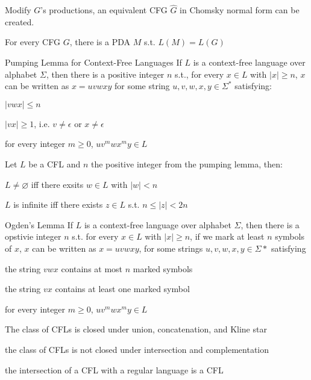 \documentclass[a4paper]{article}
\begin{document}
\begin{Theorem}{}{}
	Modify $G$'s productions, an equivalent CFG  $\hat{G}$ in Chomsky normal form can be created.
\end{Theorem}

\begin{Theorem}{}{}
	For every CFG $G$, there is a PDA  $M$ s.t.  $L(M) = L(G)$
	
\end{Theorem}

\begin{Theorem}{Pumping Lemma for Context-Free Languages}{}
	If $L$ is a context-free language over alphabet  $\Sigma$, then there is a positive integer  $n$ s.t., for every  $x \in L$ with $|x| \ge n$, $x$ can be written as  $x = uvwxy$ for some string  $u,v,w,x,y \in \Sigma^*$ satisfying:

	$|vwx| \le n$

	$|vx| \ge  1$, i.e. $v \neq  \epsilon$ or $x \neq  \epsilon$

	for every integer $m \ge  0$, $uv^m wx^m y \in L$
\end{Theorem}

\begin{Corollary}{}{}
	Let $L$ be a CFL and  $n$ the positive integer from the pumping lemma, then:

	$L \neq \varnothing$ iff there exsits $w \in L$ with $|w| < n$

	 $L$ is infinite iff there exists  $z \in L$ s.t. $n \le |z| < 2n$

\end{Corollary}


\begin{Theorem}{Ogden's Lemma}{}
	If $L$ is a context-free language over alphabet  $\Sigma$, then there is a opstivie integer  $n$ s.t. for every  $x \in L$ with $|x|\ge n$, if we mark at least $n$ symbols of  $x$,  $x$ can be written as  $x = uvwxy$, for some strings  $u,v,w,x,y \in \Sigma*$ satisfying

the string $vwx$ contains at most  $n$ marked symbols

the string  $vx$ contains at least one marked symbol

for every integer  $m \ge 0$, $uv^m w x^m y \in L$
\end{Theorem}

\begin{Theorem}{}{}
	The class of CFLs is closed under union, concatenation, and Kline star

	the class of CFLs is not closed under intersection and complementation

the intersection of a CFL with a regular language is a CFL
	
\end{Theorem}
\end{document}
